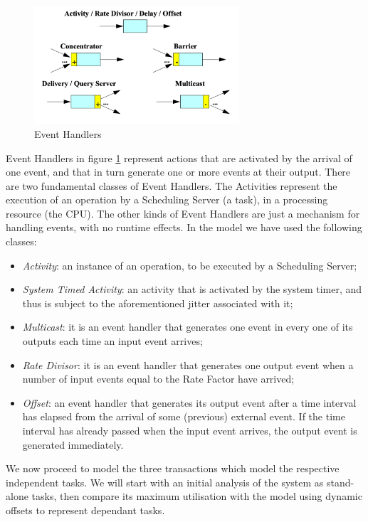 \documentclass{article}
\begin{document}
\begin{figure}[!htbp]
\centering
\includegraphics[width=3in]{images/event-handlers}
\caption{Event Handlers}
\label{event-handlers}
\end{figure}

Event Handlers in figure \ref{event-handlers} represent actions that are activated by the arrival of one event, and that in turn generate one or more events at their output. There are two fundamental classes of Event Handlers. The Activities represent the execution of an operation by a Scheduling Server (a task), in a processing resource (the CPU). The other kinds of Event Handlers are just a mechanism for handling events, with no runtime effects. In the model we have used the following classes:

\begin{itemize}
   \item \textit{Activity}: an instance of an operation, to be executed by a Scheduling Server;
   \item \textit{System Timed Activity}: an activity that is activated by the system timer, and thus is subject to the aforementioned jitter associated with it;
   \item \textit{Multicast}: it is an event handler that generates one event in every one of its outputs each time an input event arrives;
   \item \textit{Rate Divisor}: it is an event handler that generates one output event when a number of input events equal to the Rate Factor have arrived;
   \item \textit{Offset}: an event handler that generates its output event after a time interval has elapsed from the arrival of some (previous) external event. If the time interval has already passed when the input event arrives, the output event is generated immediately.
\end{itemize}

We now proceed to model the three transactions which model the respective independent tasks. We will start with an initial analysis of the system as stand-alone tasks, then compare its maximum utilisation with the model using dynamic offsets to represent dependant tasks.
\end{document}
